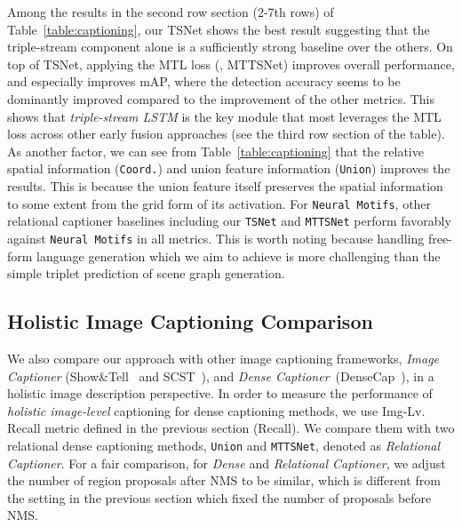 \documentclass[10pt,twocolumn,letterpaper]{article}
\begin{document}
{Among the results in the second row section (2-7th rows) of Table~\ref{table:captioning}}, our TSNet shows {the best result suggesting that the triple-stream component alone is a sufficiently strong baseline over the others.}
On top of TSNet, applying the MTL loss (\ie, MTTSNet) improves overall performance, and especially improves mAP, where the detection accuracy seems to be dominantly improved compared to the improvement of the other metrics.
This shows that \emph{triple-stream LSTM} is the key module that most leverages the MTL loss across other early fusion approaches (see the third {row section} of the table).
As another factor, {we can see from Table~\ref{table:captioning} that the relative spatial information (\texttt{Coord.}) and union feature information (\texttt{Union}) improves the results.} 
This is because 
the union feature itself preserves the spatial information to some extent from the  grid form of its activation. 
For \texttt{Neural Motifs}, other relational captioner baselines including our \texttt{TSNet} and \texttt{MTTSNet} perform favorably against \texttt{Neural Motifs} in all metrics.
This is worth noting because handling free-form language generation which we aim to achieve is more challenging than the simple triplet prediction of scene graph generation.






















\subsection{Holistic Image Captioning Comparison}
We also compare our approach with other image captioning frameworks, \emph{Image Captioner} {(Show\&Tell~\cite{vinyals2015show} and SCST~\cite{rennie2017self})}, and \emph{Dense Captioner}~(DenseCap~\cite{johnson2016densecap}), in a holistic image description perspective.
In order to measure the performance of \emph{holistic image-level} captioning for dense captioning methods, we use Img-Lv. Recall metric {defined in the previous section} (Recall).
We compare them with two relational dense captioning methods, \texttt{Union} and \texttt{MTTSNet}, denoted as \emph{Relational Captioner}.
For a fair comparison, for \emph{Dense} and \emph{Relational Captioner}, we adjust the number of region proposals after NMS to be similar, which is different from the setting in the previous section which fixed the number of proposals before NMS.
\end{document}
